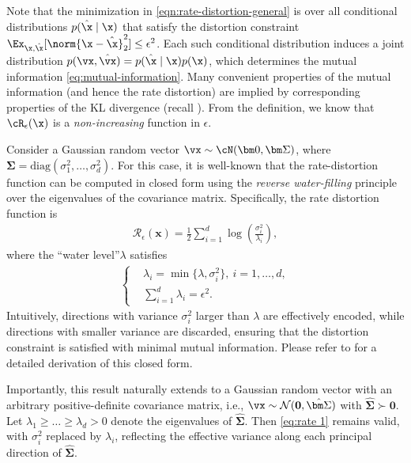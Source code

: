 \documentclass[../../book-main.tex]{subfiles}
\begin{document}
Note that the minimization
in \eqref{eqn:rate-distortion-general} is over all conditional distributions $p(\hat \x \mid \x)$
that satisfy the distortion constraint $\Ex_{\x, \hat \x}[\norm{\x- \hat \x}_2^{2}] \le \epsilon^{2}$. 
Each such conditional distribution induces a joint distribution $p(\vx,
\hat{\vx}) = p(\hat\x \mid \x) p(\x)$, which determines the mutual
information \eqref{eq:mutual-information}.
Many convenient properties of the mutual information (and hence the rate
distortion) are implied by corresponding properties of the KL divergence (recall
).
From the definition, we know that $\cR_{\epsilon}(\x)$ is a {\em non-increasing}
function in $\epsilon$.

{\color{blue}
\begin{example}\label{exam:rate Gaussian}
    Consider a Gaussian random vector $\vx \sim \cN(\bm 0, \bm \Sigma)$, where $\bm \Sigma = \mathrm{diag}(\sigma_1^2,\dots,\sigma_d^2)$. For this case, it is well-known that the rate-distortion function can be computed in closed form using the \emph{reverse water-filling} principle over the eigenvalues of the covariance matrix. Specifically, the rate distortion function is 
    \begin{align}\label{eq:rate 1}
        \mathcal{R}_{\epsilon}(\bm x) = \frac{1}{2}\sum_{i=1}^d\log\left( \frac{\sigma_i^2}{\lambda_i} \right),
    \end{align}
    where the ``water level''$\lambda$  satisfies 
    \begin{align}
    \begin{cases}
        & \lambda_i = \min\{\lambda, \sigma_i^2\},\ i = 1,\dots,d, \\
        & \sum_{i=1}^d \lambda_i = \epsilon^2.  
    \end{cases}
    \end{align}
     Intuitively, directions with variance $\sigma_i^2$ larger than $\lambda$ are 
    effectively encoded, while directions with smaller variance are discarded, 
    ensuring that the distortion constraint is satisfied with minimal mutual information. 
    Please refer to  for a detailed derivation of this closed form. 

    Importantly, this result naturally extends to a Gaussian random vector with an arbitrary positive-definite covariance matrix, i.e., $\vx \sim \mathcal{N}(\mathbf{0}, \hat{\bm \Sigma})$ with $\hat{\bm \Sigma} \succ \mathbf{0}$. Let $\lambda_1 \ge \dots \ge \lambda_d > 0$ denote the eigenvalues of $\hat{\bm \Sigma}$. Then \eqref{eq:rate 1} remains valid, with $\sigma_i^2$ replaced by $\lambda_i$, reflecting the effective variance along each principal direction of $\hat{\bm \Sigma}$.
\end{example}}
\end{document}
